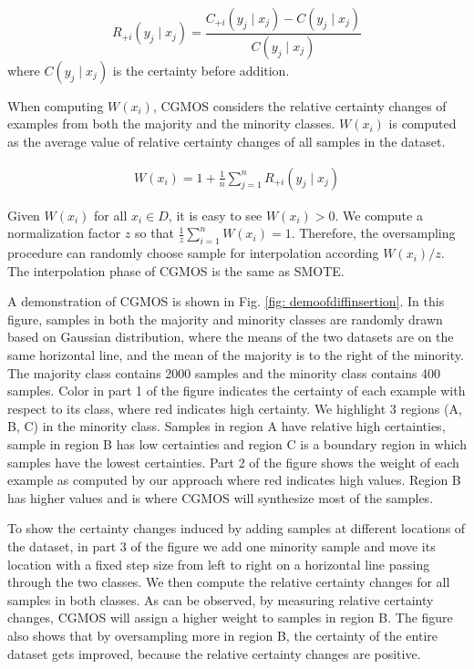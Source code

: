 \documentclass{iitthesis}
\begin{document}
\begin{equation}
R_{+i}(y_j \mid x_j)= \frac{C_{+i}(y_j \mid x_j) -C(y_j \mid x_j)}{C(y_j \mid x_j)}
\label{eqn: relative diff}
\end{equation}
where $C(y_j \mid x_j)$ is the certainty before addition.

When computing $W(x_i)$, CGMOS considers the relative certainty changes of examples from both the majority and the minority classes. $W(x_i)$ is computed as the average value of relative certainty changes of all samples in the dataset.

\begin{equation}
\begin{split}
W(x_i)= 1+\frac{1}{n}\sum_{j=1}^n R_{+i}(y_j \mid x_j)
\end{split} 
\label{eqn: weight}
\end{equation}

Given $W(x_i)$ for all $x_i \in D$, it is easy to see $W(x_i)>0$. We compute a normalization factor $z$ so that $\frac{1}{z}\sum_{i=1}^n W(x_i)=1$. Therefore, the oversampling procedure can randomly choose sample for interpolation according $W(x_i)/z$. The interpolation phase of CGMOS is  the same as SMOTE\cite{CNV:02}. 

A demonstration of CGMOS is shown in Fig. \ref{fig: demoofdiffinsertion}. In this figure, samples in both the majority and minority classes are randomly drawn based on Gaussian distribution, where the means of the two datasets are on the same horizontal line, and the mean of the majority is to the right of the minority. The majority class contains 2000 samples and the minority class contains 400 samples. Color in part 1 of the figure indicates the certainty of each example with respect to its class, where red indicates high certainty. We highlight 3 regions (A, B, C) in the minority class. Samples in region A have relative high certainties, sample in region B has low certainties and region C is a boundary region in which samples have the lowest certainties. Part 2 of the figure shows the weight of each example as computed by our approach where red indicates high values. Region B has higher values and is where CGMOS will synthesize most of the samples.

To show the certainty changes induced by adding samples at different locations of the dataset, in part 3 of the figure we add one minority sample and move its location with a fixed step size from left to right on a horizontal line passing through the two classes. We then compute the relative certainty changes for all samples in both classes. As can be observed, by measuring relative certainty changes, CGMOS will assign a higher weight to samples in region B. The figure also shows that by oversampling more in region B, the certainty of the entire dataset gets improved, because the relative certainty changes are positive.
\end{document}
